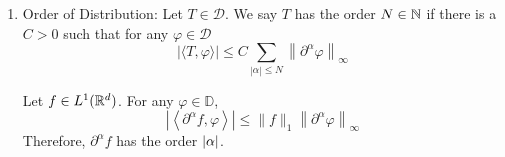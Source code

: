\begin{enumerate}[label=\arabic*.]
	\begin{prop}
		For $T,S \in \mathcal{D}^\prime$, assume $T$ or $S$ has the compact support. Then
		\begin{equation*}
			\operatorname{supp}(T * S) \subset \operatorname{supp} T+\operatorname{supp} S
		\end{equation*}
	\end{prop}
	\begin{proof}
		Only need to prove for $\varphi \in \mathcal{D}$ with $\supp \varphi \cap (\operatorname{supp} T+\operatorname{supp} S) = \varnothing$, which implies $\supp T \cap (\supp \varphi - \supp S) = \varnothing$, we have $\inn{T*S,\varphi} = 0$. First, we have
		\begin{equation*}
			\operatorname{supp}\left(S^{\sim} * \varphi\right) \subset \operatorname{supp} S^{\sim}+\operatorname{supp} \varphi=\operatorname{supp} \varphi-\operatorname{supp} S
		\end{equation*}
		Therefore,
		\begin{equation*}
			\langle T * S, \varphi\rangle=\left\langle\bar{T}, S^{\sim} * \varphi\right\rangle=0
		\end{equation*}
	\end{proof}

	\item Order of Distribution: Let $T \in \mathcal{D}$. We say $T$ has the order $N \in \mathbb{N}$ if there is a $C > 0$ such that for any $\varphi \in \mathcal{D}$
	\begin{equation*}
		|\langle T, \varphi\rangle| \leq C \sum_{|\alpha| \leq N}\left\|\partial^\alpha \varphi\right\|_{\infty}
	\end{equation*}

	\begin{exam}
		Let $f \in L^1(\mathbb{R}^d)$. For any $\varphi \in \mathbb{D}$,
		\begin{equation*}
			\left|\left\langle\partial^\alpha f, \varphi\right\rangle\right| \leq\|f\|_1\left\|\partial^\alpha \varphi\right\|_{\infty}
		\end{equation*}
		Therefore, $\partial^\alpha f$ has the order $\left\lvert\alpha\right\lvert$.
	\end{exam}


\end{enumerate}
